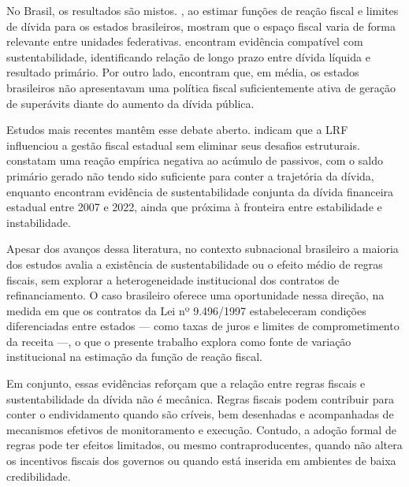 No Brasil, os resultados são mistos. , ao estimar funções de reação fiscal e limites de dívida para os estados brasileiros, mostram que o espaço fiscal varia de forma relevante entre unidades federativas.  encontram evidência compatível com sustentabilidade,  identificando relação de longo prazo entre dívida líquida e resultado primário. Por outro lado,  encontram que, em média, os estados brasileiros não apresentavam uma política fiscal suficientemente ativa de geração de superávits diante do aumento da dívida pública.

Estudos mais recentes mantêm esse debate aberto.  indicam que a LRF influenciou a gestão fiscal estadual sem eliminar seus desafios estruturais.  constatam uma reação empírica negativa ao acúmulo de passivos, com o saldo primário gerado não tendo sido suficiente para conter a trajetória da dívida, enquanto  encontram evidência de sustentabilidade conjunta da dívida financeira estadual entre 2007 e 2022, ainda que próxima à fronteira entre estabilidade e instabilidade.

Apesar dos avanços dessa literatura, no contexto subnacional brasileiro a maioria dos estudos avalia a existência de sustentabilidade ou o efeito médio de regras fiscais, sem explorar a heterogeneidade institucional dos contratos de refinanciamento. O caso brasileiro oferece uma oportunidade nessa direção, na medida em que os contratos da Lei nº 9.496/1997 estabeleceram condições diferenciadas entre estados — como taxas de juros e limites de comprometimento da receita —, o que o presente trabalho explora como fonte de variação institucional na estimação da função de reação fiscal.

Em conjunto, essas evidências reforçam que a relação entre regras fiscais e sustentabilidade da dívida não é mecânica. Regras fiscais podem contribuir para conter o endividamento quando são críveis, bem desenhadas e acompanhadas de mecanismos efetivos de monitoramento e execução. Contudo, a adoção formal de regras pode ter efeitos limitados, ou mesmo contraproducentes, quando não altera os incentivos fiscais dos governos ou quando está inserida em ambientes de baixa credibilidade.